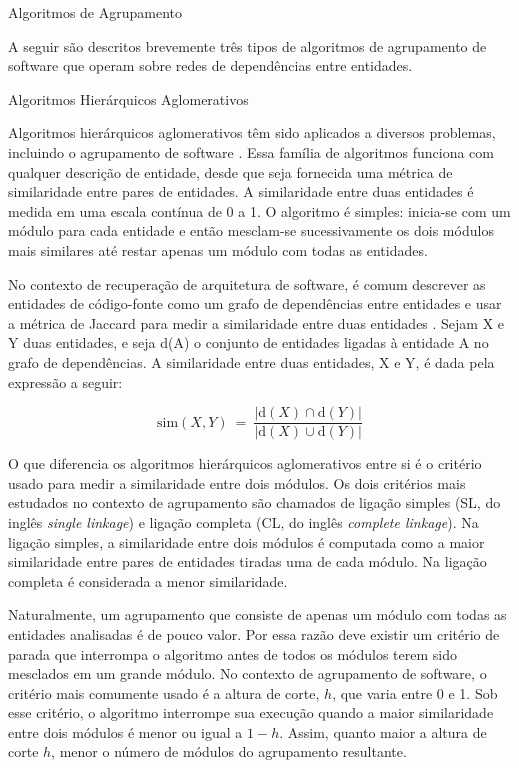 \begin{chapter}{Algoritmos de Agrupamento} \label{cap:agrupamento}

A seguir são descritos brevemente três tipos de algoritmos de agrupamento de software que operam sobre redes de dependências entre entidades. %

\begin{section}{Algoritmos Hierárquicos Aglomerativos}

Algoritmos hierárquicos aglomerativos têm sido aplicados a diversos problemas, incluindo o agrupamento de software \cite{Anquetil1999,Maqbool2007}. Essa família de algoritmos funciona com qualquer descrição de entidade, desde que seja fornecida uma métrica de similaridade entre pares de entidades. A similaridade entre duas entidades é medida em uma escala contínua de 0 a 1. O algoritmo é simples: inicia-se com um módulo para cada entidade e então mesclam-se sucessivamente os dois módulos mais similares até restar apenas um módulo com todas as entidades.

No contexto de recuperação de arquitetura de software, é comum descrever as entidades de código-fonte como um grafo de dependências entre entidades e usar a métrica de Jaccard para medir a similaridade entre duas entidades \cite{Anquetil1999}. Sejam X e Y duas entidades, e seja d(A) o conjunto de entidades ligadas à entidade A no grafo de dependências. A similaridade entre duas entidades, X e Y, é dada pela expressão a seguir:

$$
\mathrm{sim}(X, Y) ~=~ \frac{|\mathrm{d}(X) \cap \mathrm{d}(Y)|}{|\mathrm{d}(X) \cup \mathrm{d}(Y)|}
$$

O que diferencia os algoritmos hierárquicos aglomerativos entre si é o critério usado para medir a similaridade entre dois módulos. Os dois critérios mais estudados no contexto de agrupamento são chamados de ligação simples (SL, do inglês \emph{single linkage}) e ligação completa (CL, do inglês \emph{complete linkage}). Na ligação simples, a similaridade entre dois módulos é computada como a maior similaridade entre pares de entidades tiradas uma de cada módulo. Na ligação completa é considerada a menor similaridade.

Naturalmente, um agrupamento que consiste de apenas um módulo com todas as entidades analisadas é de pouco valor. Por essa razão deve existir um critério de parada que interrompa o algoritmo antes de todos os módulos terem sido mesclados em um grande módulo. No contexto de agrupamento de software, o critério mais comumente usado é a altura de corte, $h$, que varia entre 0 e 1. Sob esse critério, o algoritmo interrompe sua execução quando a maior similaridade entre dois módulos é menor ou igual a $1 - h$. Assim, quanto maior a altura de corte $h$, menor o número de módulos do agrupamento resultante.
	

\end{section}
\end{chapter}
